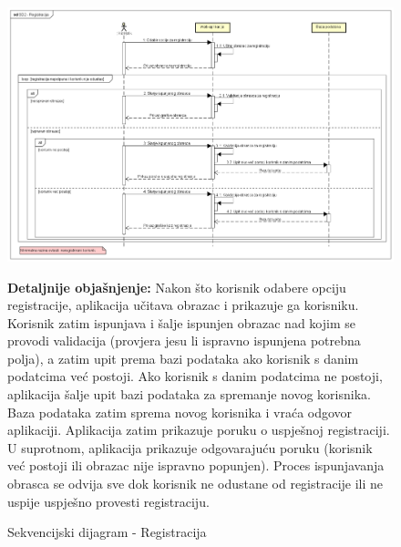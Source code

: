 \begin{figure}[hp!]
	\centering
	\includegraphics[width=\textwidth]{slike/SD2 - Registracija.png}
	\caption{Sekvencijski dijagram - Registracija}
	\begin{flushleft}
		\textbf{Detaljnije objašnjenje:}
		Nakon što korisnik odabere opciju registracije, aplikacija učitava obrazac i prikazuje ga korisniku. Korisnik zatim ispunjava i šalje ispunjen obrazac nad kojim se provodi validacija (provjera jesu li ispravno ispunjena potrebna polja), a zatim upit prema bazi podataka ako korisnik s danim podatcima već postoji. Ako korisnik s danim podatcima ne postoji, aplikacija šalje upit bazi podataka za spremanje novog korisnika. Baza podataka zatim sprema novog korisnika i vraća odgovor aplikaciji. Aplikacija zatim prikazuje poruku o uspješnoj registraciji. U suprotnom, aplikacija prikazuje odgovarajuću poruku (korisnik već postoji ili obrazac nije ispravno popunjen). Proces ispunjavanja obrasca se odvija sve dok korisnik ne odustane od registracije ili ne uspije uspješno provesti registraciju.
	\end{flushleft}
\end{figure}
\pagebreak

